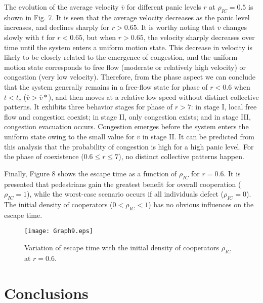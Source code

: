 \documentclass[%
 reprint,
 amsmath,amssymb,
 aps,
]{revtex4-1}
\begin{document}
The evolution of the average velocity $\overline{v}$ for different panic levels $r$ at $\rho_{IC}=0.5$ is shown in Fig. 7. It is seen that the average velocity decreases as the panic level increases, and declines sharply for $r> 0.65$. It is worthy noting that $\overline{v}$ changes slowly with $t$ for $r < 0.65$, but when $r > 0.65$, the velocity sharply decreases over time until the system enters a uniform motion state. This decrease in velocity is likely to be closely related to the emergence of congestion, and the uniform-motion state corresponds to free flow (moderate or relatively high velocity) or congestion (very low velocity). Therefore, from the phase aspect we can conclude that the system generally remains in a free-flow state for phase of $r < 0.6$ when $t<t_{c}$ ($\overline{v}>\overline{v}*$), and then moves at a relative low speed without distinct collective patterns. It exhibits three behavior stages for phase of $r > 7$: in stage I, local free flow and congestion coexist; in stage II, only congestion exists; and in stage III, congestion evacuation occurs. Congestion emerges before the system enters the uniform state owing to the small value for $\overline{v}$ in stage II. It can be predicted from this analysis that the probability of congestion is high for a high panic level. For the phase of coexistence ($0.6\leq r\leq7$), no distinct collective patterns happen.


Finally, Figure 8 shows the escape time as a function of $\rho_{IC}$ for $r = 0.6$. It is presented that pedestrians gain the greatest benefit for overall cooperation ($\rho_{IC}=1$), while the worst-case scenario occurs if all individuals defect ($\rho_{IC}=0$). The initial density of cooperators ($0<\rho_{IC}<1$) has no obvious influences on the escape time.


\begin{figure}
\centerline{\texttt{[image: Graph9.eps]}}
\caption{Variation of escape time with the initial density of cooperators $\rho_{IC}$ at $r=0.6$. }\label{afoto}
\end{figure}


\section{\label{sec:level1}Conclusions}
\end{document}
